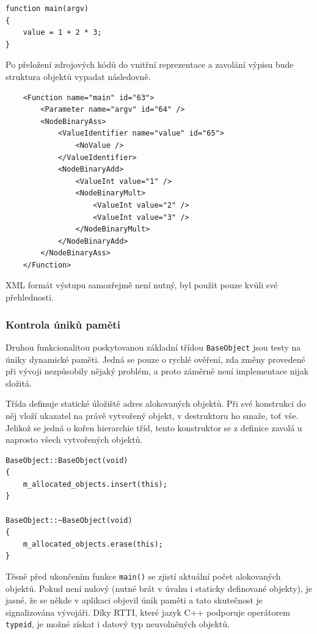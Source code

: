\documentclass[11pt,twoside,a4paper]{book}
\begin{document}
\begin{verbatim}
function main(argv)
{
    value = 1 + 2 * 3;
}
\end{verbatim}

Po přeložení zdrojových kódů do vnitřní reprezentace a zavolání výpisu bude struktura objektů vypadat následovně.

\begin{verbatim}
    <Function name="main" id="63">
        <Parameter name="argv" id="64" />
        <NodeBinaryAss>
            <ValueIdentifier name="value" id="65">
                <NoValue />
            </ValueIdentifier>
            <NodeBinaryAdd>
                <ValueInt value="1" />
                <NodeBinaryMult>
                    <ValueInt value="2" />
                    <ValueInt value="3" />
                </NodeBinaryMult>
            </NodeBinaryAdd>
        </NodeBinaryAss>
    </Function>
\end{verbatim}

XML formát výstupu samozřejmě není nutný, byl použit pouze kvůli své pře\-hled\-nos\-ti.


\subsubsection{Kontrola úniků paměti}
\label{kontrola_uniku_pameti}

Druhou funkcionalitou poskytovanou základní třídou \texttt{BaseObject} jsou testy na úniky dynamické paměti. Jedná se pouze o rychlé ověření, zda změny provedené při vývoji nezpůsobily nějaký problém, a proto záměrně není implementace nijak složitá.

Třída definuje statické úložiště adres alokovaných objektů. Při své konstrukci do něj vloží ukazatel na právě vytvořený objekt, v destruktoru ho smaže, toť vše. Jelikož se jedná o kořen hierarchie tříd, tento konstruktor se z definice zavolá u naprosto všech vytvořených objektů.

\begin{verbatim}
BaseObject::BaseObject(void)
{
    m_allocated_objects.insert(this);
}

BaseObject::~BaseObject(void)
{
    m_allocated_objects.erase(this);
}
\end{verbatim}

Těsně před ukončením funkce \texttt{main()} se zjistí aktuální počet alokovaných objektů. Pokud není nulový (nutné brát v úvahu i staticky definované objekty), je jasné, že se někde v aplikaci objevil únik paměti a tato skutečnost je signalizována vývojáři. Díky RTTI, které jazyk C++ podporuje operátorem \texttt{typeid}, je možné získat i datový typ neuvolněných objektů.
\end{document}
